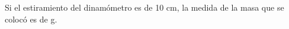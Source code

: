 Si el estiramiento del dinamómetro es de 10 cm, la medida de la masa que se colocó es de \fillin[20][0.5cm] g.